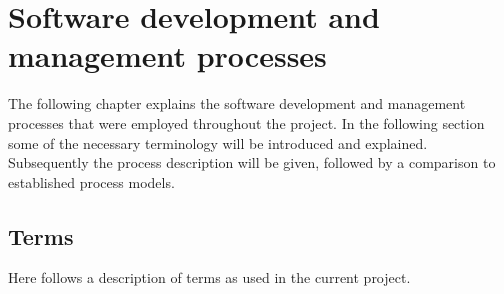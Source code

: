 \chapter{Software development and management processes}
The following chapter explains the software development and management processes that were employed throughout the project. In the following section some of the necessary terminology will be introduced and explained. Subsequently the process description will be given, followed by a comparison to established process models.

\section{Terms}
Here follows a description of terms as used in the current project.

